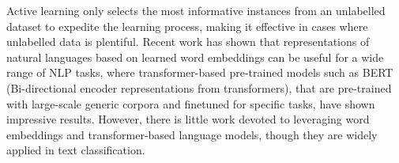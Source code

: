 Active learning only selects the most informative instances from an unlabelled dataset
to expedite the learning process, making it effective in cases where unlabelled data is 
plentiful. Recent work has shown that representations of natural languages based on 
learned word embeddings can be useful for a wide range of NLP tasks, where 
transformer-based pre-trained models such as BERT (Bi-directional encoder representations 
from transformers), that are pre-trained with large-scale generic corpora and finetuned 
for specific tasks, have shown impressive results. However, there is little work devoted to 
leveraging word embeddings and transformer-based language models, though they are widely 
applied in text classification. 